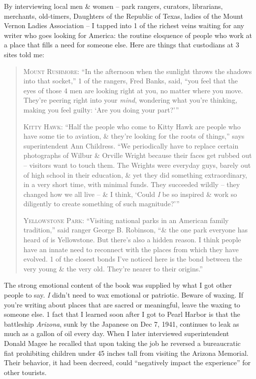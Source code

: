 \documentclass{article}
\begin{document}
By interviewing local men \& women -- park rangers, curators, librarians, merchants, old-timers, Daughters of the Republic of Texas, ladies of the Mount Vernon Ladies Association -- I tapped into 1 of the richest veins waiting for any writer who goes looking for America: the routine eloquence of people who work at a place that fills a need for someone else. Here are things that custodians at 3 sites told me:
\begin{quotation}
	\textsc{Mount Rushmore}: ``In the afternoon when the sunlight throws the shadows into that socket,'' 1 of the rangers, Fred Banks, said, ``you feel that the eyes of those 4 men are looking right at you, no matter where you move. They're peering right into your \textit{mind}, wondering what you're thinking, making you feel guilty: `Are you doing your part?'''
	
	\textsc{Kitty Hawk}: ``Half the people who come to Kitty Hawk are people who have some tie to aviation, \& they're looking for the roots of things,'' says superintendent Ann Childress. ``We periodically have to replace certain photographs of Wilbur \& Orville Wright because their faces get rubbed out -- visitors want to touch them. The Wrights were everyday guys, barely out of high school in their education, \& yet they did something extraordinary, in a very short time, with minimal funds. They succeeded wildly -- they changed how we all live -- \& I think, `Could \textit{I} be so inspired \& work so diligently to create something of such magnitude?'''
	
	\textsc{Yellowstone Park}: ``Visiting national parks in an American family tradition,'' said ranger George B. Robinson, ``\& the one park everyone has heard of is Yellowstone. But there's also a hidden reason. I think people have an innate need to reconnect with the places from which they have evolved. 1 of the closest bonds I've noticed here is the bond between the very young \& the very old. They're nearer to their origins.''
\end{quotation}
The strong emotional content of the book was supplied by what I got other people to say. \textit{I} didn't need to wax emotional or patriotic. Beware of waxing. If you're writing about places that are sacred or meaningful, leave the waxing to someone else. 1 fact that I learned soon after I got to Pearl Harbor is that the battleship \textit{Arizona}, sunk by the Japanese on Dec 7, 1941, continues to leak as much as a gallon of oil every day. When I later interviewed superintendent Donald Magee he recalled that upon taking the job he reversed a bureaucratic fiat prohibiting children under 45 inches tall from visiting the Arizona Memorial. Their behavior, it had been decreed, could ``negatively impact the experience'' for other tourists.
\end{document}
